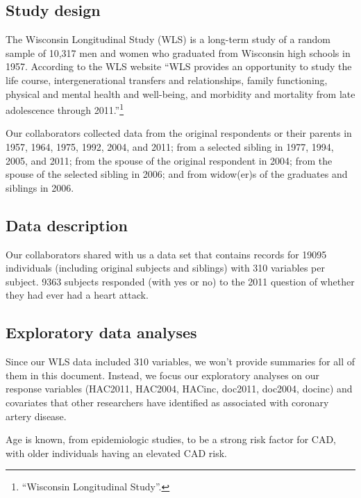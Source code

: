 \documentclass[11pt,]{article}
\let\rmarkdownfootnote\footnote%
\def\footnote{\protect\rmarkdownfootnote}
\begin{document}
\subsection{Study design}\label{study-design}

The Wisconsin Longitudinal Study (WLS) is a long-term study of a random
sample of 10,317 men and women who graduated from Wisconsin high schools
in 1957. According to the WLS website ``WLS provides an opportunity to
study the life course, intergenerational transfers and relationships,
family functioning, physical and mental health and well-being, and
morbidity and mortality from late adolescence through 2011.''\footnote{``Wisconsin
  Longitudinal Study''. }


Our collaborators collected data from the original respondents or their
parents in 1957, 1964, 1975, 1992, 2004, and 2011; from a selected
sibling in 1977, 1994, 2005, and 2011; from the spouse of the original
respondent in 2004; from the spouse of the selected sibling in 2006; and
from widow(er)s of the graduates and siblings in 2006.

\subsection{Data description}\label{data-description}

Our collaborators shared with us a data set that contains records for
19095 individuals (including original subjects and siblings) with 310
variables per subject. 9363 subjects responded (with yes or no) to the
2011 question of whether they had ever had a heart attack.

\subsection{Exploratory data analyses}\label{exploratory-data-analyses}

Since our WLS data included 310 variables, we won't provide summaries
for all of them in this document. Instead, we focus our exploratory
analyses on our response variables (HAC2011, HAC2004, HACinc, doc2011,
doc2004, docinc) and covariates that other researchers have identified
as associated with coronary artery disease.

Age is known, from epidemiologic studies, to be a strong risk factor for
CAD, with older individuals having an elevated CAD risk.

\end{document}
